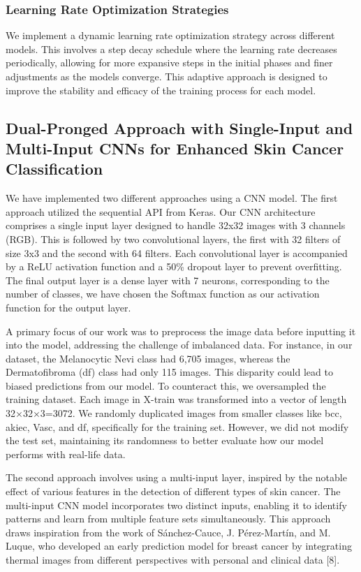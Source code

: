 \documentclass[conference]{IEEEtran}
\begin{document}
\subsubsection{Learning Rate Optimization Strategies}
We implement a dynamic learning rate optimization strategy across different models. This involves a step decay schedule where the learning rate decreases periodically, allowing for more expansive steps in the initial phases and finer adjustments as the models converge. This adaptive approach is designed to improve the stability and efficacy of the training process for each model.

\subsection{Dual-Pronged Approach with Single-Input and Multi-Input CNNs for Enhanced Skin Cancer Classification}
 We have implemented two different approaches using a CNN model. The first approach utilized the sequential API from Keras. Our CNN architecture comprises a single input layer designed to handle 32x32 images with 3 channels (RGB). This is followed by two convolutional layers, the first with 32 filters of size 3x3 and the second with 64 filters. Each convolutional layer is accompanied by a ReLU activation function and a 50\% dropout layer to prevent overfitting. The final output layer is a dense layer with 7 neurons, corresponding to the number of classes, we have chosen the Softmax function as our activation function for the output layer.

A primary focus of our work was to preprocess the image data before inputting it into the model, addressing the challenge of imbalanced data. For instance, in our dataset, the Melanocytic Nevi class had 6,705 images, whereas the Dermatofibroma (df) class had only 115 images. This disparity could lead to biased predictions from our model. To counteract this, we oversampled the training dataset. Each image in X-train was transformed into a vector of length 32×32×3=3072. We randomly duplicated images from smaller classes like bcc, akiec, Vasc, and df, specifically for the training set. However, we did not modify the test set, maintaining its randomness to better evaluate how our model performs with real-life data.

The second approach involves using a multi-input layer, inspired by the notable effect of various features in the detection of different types of skin cancer. The multi-input CNN model incorporates two distinct inputs, enabling it to identify patterns and learn from multiple feature sets simultaneously. This approach draws inspiration from the work of Sánchez-Cauce, J. Pérez-Martín, and M. Luque, who developed an early prediction model for breast cancer by integrating thermal images from different perspectives with personal and clinical data [8].
\end{document}
